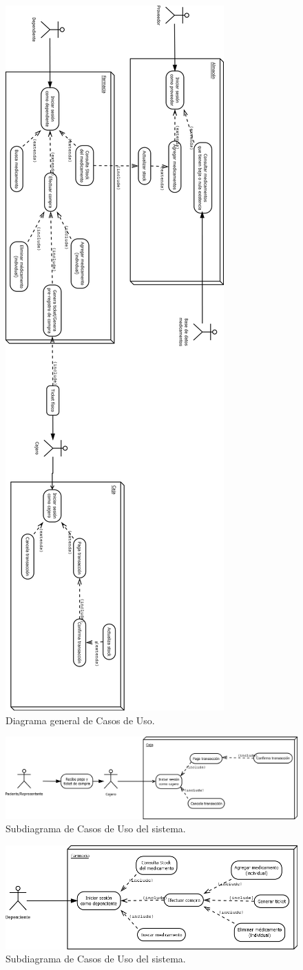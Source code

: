 \documentclass[oneside,10pt]{book}
\begin{document}
	
	\begin{figure}[htbp!]
	\centering
		\includegraphics[width=.4\textwidth]{images/cu/diagramaGral4}
		\caption{Diagrama general de Casos de Uso.}
	\end{figure}
	\begin{figure}[htbp!]
		\centering
			\includegraphics[width=1\textwidth]{images/cu/caja}
		\caption{Subdiagrama de Casos de Uso del sistema.}
	\end{figure}
	\begin{figure}[htbp!]
		\centering
			\includegraphics[width=1\textwidth]{images/cu/farmacia}
		\caption{Subdiagrama de Casos de Uso del sistema.}
	\end{figure}
\end{document}
